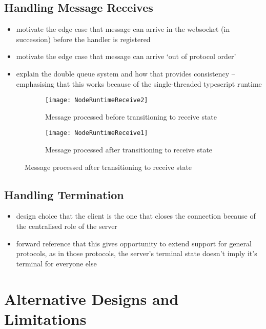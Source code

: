 \subsection{Handling Message Receives}
\begin{itemize}
\item motivate the edge case that message can arrive in the websocket (in succession) before the handler is registered
\item motivate the edge case that message can arrive `out of protocol order' 
\item explain the double queue system and how that provides consistency -- emphasising that this works because of the single-threaded typescript runtime
\end{itemize}

\begin{figure}[!ht]
\centering
\begin{subfigure}[b]{0.8\textwidth}
\centering
\texttt{[image: NodeRuntimeReceive2]}
\caption{Message processed before transitioning to receive state}
\label{subfig:nodereceivemsgfirst}
\end{subfigure}
\hfill
\begin{subfigure}[b]{0.8\textwidth}
\centering
\texttt{[image: NodeRuntimeReceive1]}
\caption{Message processed after transitioning to receive state}
\label{subfig:nodereceivehandlefirst}
\end{subfigure}
\label{fig:nodereceivecompare}
\end{figure}

\subsection{Handling Termination}
\begin{itemize}
\item design choice that the client is the one that closes the connection because of the centralised role of the server
\item forward reference that this gives opportunity to extend support for general protocols, as in those protocols, the server's terminal state doesn't imply it's terminal for everyone else
\end{itemize}

\section{Alternative Designs and Limitations}


